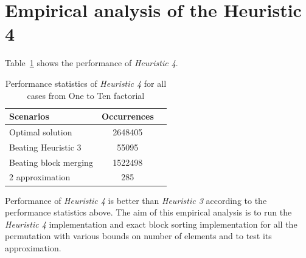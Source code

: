 \documentclass[BTech]{iitmdiss}
\begin{document}
\section{Empirical analysis of the Heuristic 4}
Table~\ref{tab:heursat2} shows the performance of \textit{Heuristic 4}.
\begin{table}[htbp]
  \caption{Performance statistics of \textit{Heuristic 4} for all cases from One to Ten factorial}
  \begin{center}
  \begin{tabular}[c]{|l|c|c|} \hline
    \textbf{Scenarios} & \textbf{Occurrences}\\ \hline
    Optimal solution & 2648405  \\ \hline
    Beating Heuristic 3 &  55095 \\ \hline
    Beating block merging &  1522498 \\ \hline
    2 approximation & 285 \\ \hline
  \end{tabular}
  \label{tab:heursat2}
  \end{center}
\end{table}
Performance of \textit{Heuristic 4} is better than \textit{Heuristic 3} according to the performance statistics above. The aim of this empirical analysis is to run the \textit{Heuristic 4} implementation and exact block sorting implementation for all the permutation with various bounds on number of elements and to test its approximation. 






\begin{singlespace}
  
\end{singlespace}




\end{document}
